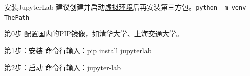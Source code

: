 \documentclass[aspectratio=169, 14pt]{beamer}
\begin{document}
\begin{frame}{安装JupyterLab}
	建议创建并启动\href{https://docs.python.org/3/tutorial/venv.html}{虚拟环境}后再安装第三方包。\texttt{python -m venv ThePath}
	\begin{block}{第0步}
		配置国内的PIP镜像，如\href{https://mirrors.tuna.tsinghua.edu.cn/help/pypi/}{清华大学}、\href{https://mirror.sjtu.edu.cn/docs/pypi/web/simple}{上海交通大学}。
	\end{block}
	\begin{block}{第1步：安装}
		命令行输入：pip install jupyterlab
	\end{block}
	\begin{block}{第2步：启动}
		命令行输入：jupyter-lab
	\end{block}
\end{frame}
\end{document}
